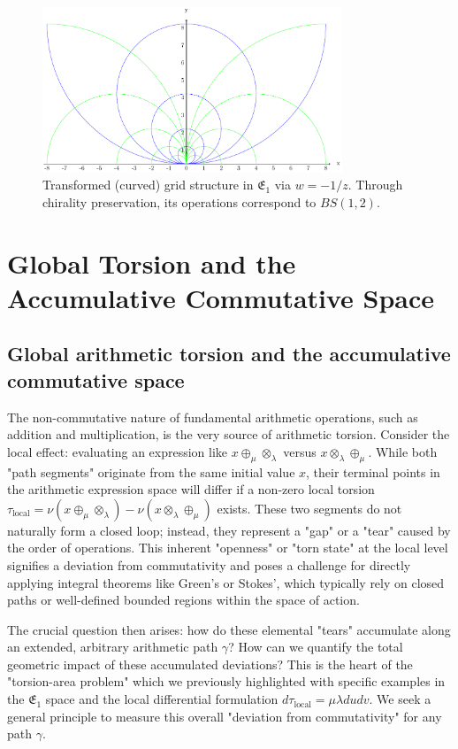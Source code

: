 \documentclass[12pt]{article}
\begin{document}
\begin{figure}[ht]
\centering
\includegraphics[width=0.8\textwidth]{images/18-grid-example-2.pdf}
\caption{Transformed (curved) grid structure in $\mathfrak{E}_1$ via $w=-1/z$. Through chirality preservation, its operations correspond to $BS(1,2)$.}\label{fig:grid2_revised-full}
\end{figure}

\section{Global Torsion and the Accumulative Commutative Space}

\subsection{Global arithmetic torsion and the accumulative commutative space}
\label{sec:global_torsion_acs_narrative_enhanced_lc}

The non-commutative nature of fundamental arithmetic operations, such as addition and multiplication, is the very source of arithmetic torsion. Consider the local effect: evaluating an expression like $x \oplus_\mu \otimes_\lambda$ versus $x \otimes_\lambda \oplus_\mu$. While both "path segments" originate from the same initial value $x$, their terminal points in the arithmetic expression space will differ if a non-zero local torsion $\tau_{\text{local}} = \nu(x \oplus_\mu \otimes_\lambda) - \nu(x \otimes_\lambda \oplus_\mu)$ exists. These two segments do not naturally form a closed loop; instead, they represent a "gap" or a "tear" caused by the order of operations. This inherent "openness" or "torn state" at the local level signifies a deviation from commutativity and poses a challenge for directly applying integral theorems like Green's or Stokes', which typically rely on closed paths or well-defined bounded regions within the space of action.

The crucial question then arises: how do these elemental "tears" accumulate along an extended, arbitrary arithmetic path $\gamma$? How can we quantify the total geometric impact of these accumulated deviations? This is the heart of the "torsion-area problem" which we previously highlighted with specific examples in the $\mathfrak{E}_1$ space and the local differential formulation $d\tau_{\text{local}} = \mu \lambda du dv$. We seek a general principle to measure this overall "deviation from commutativity" for any path $\gamma$.
\end{document}
